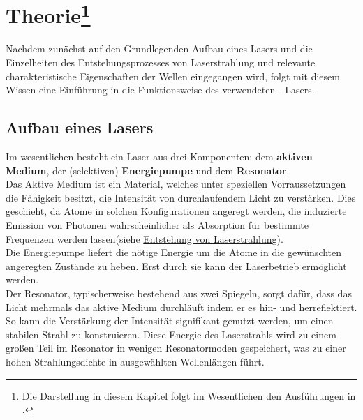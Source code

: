 \section[Theorie]{Theorie\footnote{Die Darstellung in diesem Kapitel folgt im
Wesentlichen den Ausführungen in \cite{Demtroeder, eichler}.}}\label{sec:theorie}
Nachdem zunächst auf den Grundlegenden Aufbau eines Lasers und die Einzelheiten des Entstehungsprozesses von Laserstrahlung und relevante charakteristische Eigenschaften der Wellen eingegangen wird, folgt mit diesem Wissen eine Einführung in die Funktionsweise des verwendeten --Lasers.
\subsection{Aufbau eines Lasers}
Im wesentlichen besteht ein Laser aus drei Komponenten: dem \textbf{aktiven Medium}, der (selektiven) \textbf{Energiepumpe} und dem \textbf{Resonator}.\\
Das Aktive Medium ist ein Material, welches unter speziellen Vorraussetzungen die Fähigkeit besitzt, die Intensität von durchlaufendem Licht zu verstärken. Dies geschieht, da Atome in solchen Konfigurationen angeregt werden, die induzierte Emission von Photonen wahrscheinlicher als Absorption für bestimmte Frequenzen werden lassen(siehe \hyperref[subsec:entstehung]{Entstehung von Laserstrahlung}).\\
Die Energiepumpe liefert die nötige Energie um die Atome in die gewünschten angeregten Zustände zu heben. Erst durch sie kann der Laserbetrieb ermöglicht werden.\\
Der Resonator, typischerweise bestehend aus zwei Spiegeln, sorgt dafür, dass das Licht mehrmals das aktive Medium durchläuft indem er es hin- und herreflektiert. So kann die Verstärkung der Intensität signifikant genutzt werden, um einen stabilen Strahl zu konstruieren. Diese Energie des Laserstrahls wird zu einem großen Teil im Resonator in wenigen Resonatormoden gespeichert, was zu einer hohen Strahlungsdichte in ausgewählten Wellenlängen führt.\cite{Demtroeder} 
